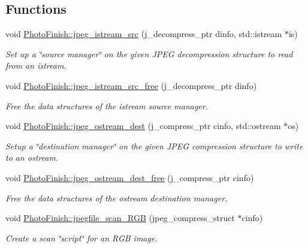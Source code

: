 \subsection*{Functions}
\begin{DoxyCompactItemize}
\item 
void \hyperlink{namespace_photo_finish_a18ffc326d36fb31d16a6468b4bfc4715}{Photo\+Finish\+::jpeg\+\_\+istream\+\_\+src} (j\+\_\+decompress\+\_\+ptr dinfo, std\+::istream $\ast$is)
\begin{DoxyCompactList}\small\item\em Set up a \char`\"{}source manager\char`\"{} on the given J\+P\+EG decompression structure to read from an istream. \end{DoxyCompactList}\item 
void \hyperlink{namespace_photo_finish_aca76b52b734af33c592f35e545811952}{Photo\+Finish\+::jpeg\+\_\+istream\+\_\+src\+\_\+free} (j\+\_\+decompress\+\_\+ptr dinfo)
\begin{DoxyCompactList}\small\item\em Free the data structures of the istream source manager. \end{DoxyCompactList}\item 
void \hyperlink{namespace_photo_finish_a8d7e2916997da593705b47a56cf33ea2}{Photo\+Finish\+::jpeg\+\_\+ostream\+\_\+dest} (j\+\_\+compress\+\_\+ptr cinfo, std\+::ostream $\ast$os)
\begin{DoxyCompactList}\small\item\em Setup a \char`\"{}destination manager\char`\"{} on the given J\+P\+EG compression structure to write to an ostream. \end{DoxyCompactList}\item 
void \hyperlink{namespace_photo_finish_a83c709bef3546d9271d51694a7bdbbab}{Photo\+Finish\+::jpeg\+\_\+ostream\+\_\+dest\+\_\+free} (j\+\_\+compress\+\_\+ptr cinfo)
\begin{DoxyCompactList}\small\item\em Free the data structures of the ostream destination manager. \end{DoxyCompactList}\item 
void \hyperlink{namespace_photo_finish_a790e2181f2d498b2d37bf662d4d39fe1}{Photo\+Finish\+::jpegfile\+\_\+scan\+\_\+\+R\+GB} (jpeg\+\_\+compress\+\_\+struct $\ast$cinfo)
\begin{DoxyCompactList}\small\item\em Create a scan \char`\"{}script\char`\"{} for an R\+GB image. \end{DoxyCompactList}\item 

\end{DoxyCompactItemize}
